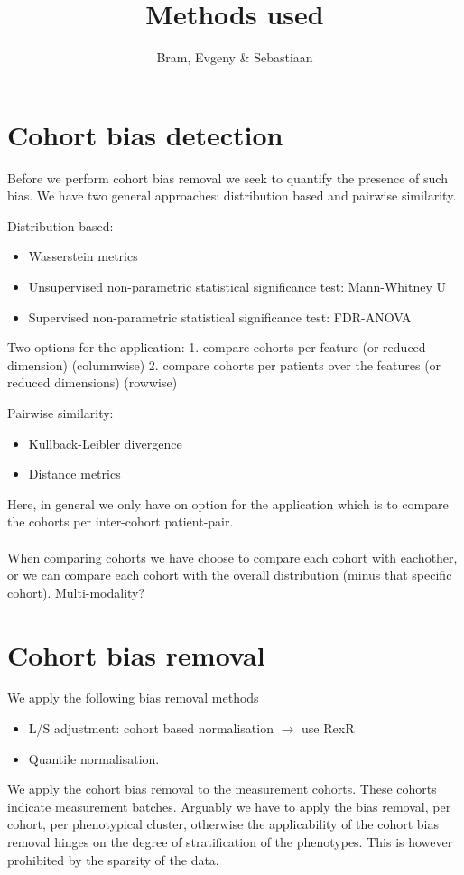 \documentclass[a4paper,10pt]{article}
\title{Methods used}
\author{Bram, Evgeny \& Sebastiaan}
\begin{document}
\section{Cohort bias detection}
%
Before we perform cohort bias removal we seek to quantify the presence of such bias.
We have two general approaches: distribution based and pairwise similarity.

Distribution based: 
\begin{itemize}
 \item Wasserstein metrics
 \item Unsupervised non-parametric statistical significance test: Mann-Whitney U
 \item Supervised non-parametric statistical significance test: FDR-ANOVA
\end{itemize}
%
Two options for the application:
1. compare cohorts per feature (or reduced dimension) (columnwise)
2. compare cohorts per patients over the features (or reduced dimensions) (rowwise)

Pairwise similarity:
\begin{itemize}
 \item Kullback-Leibler divergence
 \item Distance metrics 
\end{itemize}
%
Here, in general we only have on option for the application which is to compare the cohorts per inter-cohort patient-pair.\\\\
When comparing cohorts we have choose to compare each cohort with eachother, or we can compare each cohort with the overall distribution (minus that specific cohort).
%
Multi-modality? 
%
\section{Cohort bias removal}
%
We apply the following bias removal methods
%
\begin{itemize}
\item L/S adjustment: cohort based normalisation $\rightarrow$ use RexR
\item Quantile normalisation.
\end{itemize}

We apply the cohort bias removal to the measurement cohorts. These cohorts indicate measurement batches.
%
Arguably we have to apply the bias removal, per cohort, per phenotypical cluster, otherwise
the applicability of the cohort bias removal hinges on the degree of stratification of the phenotypes.
This is however prohibited by the sparsity of the data.
\end{document}
